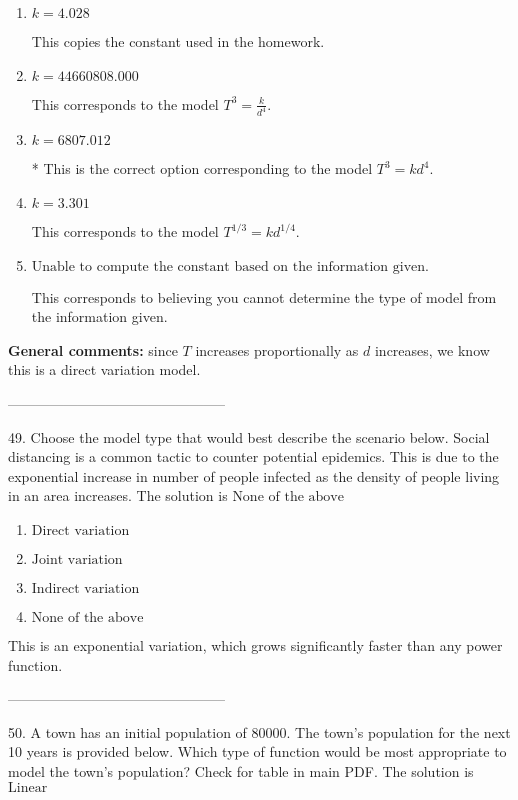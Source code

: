 \documentclass{extbook}[14pt]
\begin{document}
\begin{enumerate}[label=\Alph*.] 
\item $ k = 4.028 $ 

 This copies the constant used in the homework. 
\item $ k = 44660808.000 $ 

 This corresponds to the model $T^{3} = \frac{k}{d^{4}}$. 
\item $ k = 6807.012 $ 

 * This is the correct option corresponding to the model $T^{3} = k d^{4}$. 
\item $ k = 3.301 $ 

 This corresponds to the model $T^{1/3} = k d^{1/4}$. 
\item $ \text{Unable to compute the constant based on the information given.} $ 

 This corresponds to believing you cannot determine the type of model from the information given. 
\end{enumerate} 
 
\textbf{General comments:} since $T$ increases proportionally as $d$ increases, we know this is a direct variation model.

-----------------------------------------------

49. Choose the model type that would best describe the scenario below.
Social distancing is a common tactic to counter potential epidemics. This is due to the exponential increase in number of people infected as the density of people living in an area increases. 
The solution is $ \text{None of the above} $ 

\begin{enumerate}[label=\Alph*.] 
\item $ \text{Direct variation} $ 

  
\item $ \text{Joint variation} $ 

  
\item $ \text{Indirect variation} $ 

  
\item $ \text{None of the above} $ 

  
\end{enumerate} 
 
This is an exponential variation, which grows significantly faster than any power function.

-----------------------------------------------

50. A town has an initial population of 80000. The town's population for the next 10 years is provided below. Which type of function would be most appropriate to model the town's population?
Check for table in main PDF. 
The solution is $ \text{Linear} $ 
\end{document}
